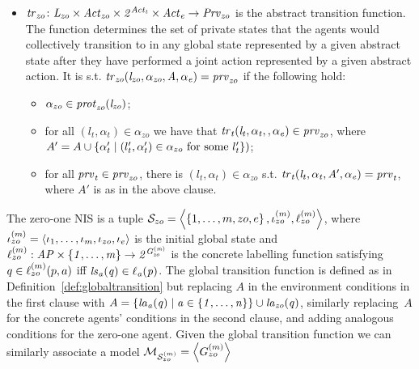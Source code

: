 \begin{definition}
\begin{itemize}
    \item $\it{tr}_{zo} \colon L_{zo} \times \it{Act}_{zo} \times 2^{\it{Act}_{t}} 
    \times \it{Act}_{e} \rightarrow \it{Prv}_{zo}$ is the abstract transition function.
    The function determines the set of private states that the agents would
    collectively transition to in any global state represented by a given
    abstract state after they have performed a joint action represented by a
    given abstract action. It is s.t. $\it{tr}_{zo}(l_{zo}, \alpha_{zo}, A, \alpha_e)
    = \it{prv}_{zo}$ if the following hold:
    \begin{itemize}
        \item $\alpha_{zo} \in \it{prot}_{zo}(l_{zo})$; 
        \item for all $(l_t, \alpha_t) \in \alpha_{zo}$ we have that $\it{tr}_{t}(l_t,
        \alpha_t, , \alpha_e) \in \it{prv}_{zo}$, where $A' = A \cup \left \{ \alpha'_t
        \mid (l'_t, \alpha'_t) \in \alpha_{zo} \text{ for some } l'_t \right \})$; 
        \item for all $\it{prv}_{t} \in \it{prv}_{zo}$, there is $(l_t, \alpha_t) \in
        \alpha_{zo}$ s.t. $\it{tr}_{t}(l_t, \alpha_t, A', \alpha_e) = \it{prv}_{t}$, where
        $A'$ is as in the above clause.  
    \end{itemize}
\end{itemize}
\end{definition}

The zero-one NIS is a tuple $\mathcal S_{zo} = \left \langle \left \{ 1,\ldots,m,zo,e \right \},
\iota^{({m})}_{zo}, \ell^{(m)}_{zo} \right \rangle$, where $\iota^{({m})}_{zo} =
\left \langle \iota_{1}, \ldots, \iota_{m}, \iota_{zo}, \iota_{e} \right \rangle$ is the initial global
state and $\ell^{(m)}_{zo} : \it{AP} \times \left \{ 1, \ldots, m  \right \} \rightarrow
2^{G^{(m)}_{zo}}$ is the concrete labelling function satisfying $q \in
\ell^{(m)}_{zo}(p,a)$ iff $\it{ls}_{a}(q) \in \ell_{a}(p)$.  The global
transition function is defined as in Definition~\ref{def:globaltransition} but
replacing $A$ in the environment conditions in the first clause with $A =
\left \{ \it{la}_{a}({q}) \mid a \in \left \{ 1,\ldots,n \right \} \right \} \cup \it{la}_{zo}({q})$, similarly
replacing~$A$ for the concrete agents' conditions in the second clause, and
adding analogous conditions for the zero-one agent. Given the global transition
function we can similarly associate a model  $\mathcal{M}_{\mathcal{S}_{zo}^{(m)}} = \left \langle G^{(m)}_{zo} \right \rangle$

